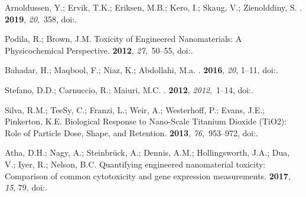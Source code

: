 \documentclass[ijms,article,accept,moreauthors,pdftex]{Definitions/mdpi}
\begin{document}
\begin{thebibliography}{999}
Arnoldussen, Y.; Ervik, T.K.; Eriksen, M.B.; Kero, I.; Skaug, V.; Zienolddiny,
  S.
.
 {\bf 2019}, {\em
  20},~358,
\newblock
  doi:{\href{https://doi.org/10.3390/ijms20020358}{}}.

Podila, R.; Brown, J.M.
\newblock Toxicity of Engineered Nanomaterials: A Physicochemical Perspective.
 {\bf 2012},
  {\em 27},~50--55,
\newblock
  doi:{\href{https://doi.org/10.1002/jbt.21442}{}}.

Bahadar, H.; Maqbool, F.; Niaz, K.; Abdollahi, M.a.
.
 {\bf 2016}, {\em 20}, 1--11, 
\newblock
  doi:{\href{https://doi.org/10.7508/ibj.2016.01.001}{}}.

Stefano, D.D.; Carnuccio, R.; Maiuri, M.C.
.
 {\bf 2012}, {\em 2012},~1--14,
\newblock
  doi:{\href{https://doi.org/10.1155/2012/167896}{}}.

Silva, R.M.; TeeSy, C.; Franzi, L.; Weir, A.; Westerhoff, P.; Evans, J.E.;
  Pinkerton, K.E.
\newblock Biological Response to Nano-Scale Titanium Dioxide ({TiO}2): Role of
  Particle Dose, Shape, and Retention.
 {\bf
  2013}, {\em 76},~953--972,
\newblock
  doi:{\href{https://doi.org/10.1080/15287394.2013.826567}{}}.

Atha, D.H.; Nagy, A.; Steinbr\"{u}ck, A.; Dennis, A.M.; Hollingsworth, J.A.;
  Dua, V.; Iyer, R.; Nelson, B.C.
\newblock Quantifying engineered nanomaterial toxicity: Comparison of common
  cytotoxicity and gene expression measurements.
 {\bf 2017}, {\em 15}, 79, 
\newblock
  doi:{\href{https://doi.org/10.1186/s12951-017-0312-3}{}}.


\end{thebibliography}
\end{document}
